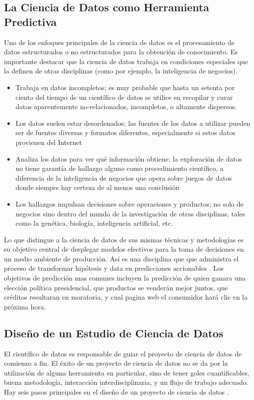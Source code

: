 \begin{spacing}{1.5}
\subsection{La Ciencia de Datos como Herramienta Predictiva}
Uno de los enfoques principales de la ciencia de datos es el procesamiento de datos estructurados o no estructurados para la obtención de conocimiento. Es importante destacar que la ciencia de datos trabaja en condiciones especiales que la definen de otras disciplinas (como por ejemplo, la inteligencia de negocios). 

\begin{itemize}
	\item Trabaja en datos incompletos; es muy probable que hasta un setenta por ciento del tiempo de un científico de datos se utilice en recopilar y curar datos aparentemente no-relacionados, incompletos, o altamente dispersos. 
	\item Los datos suelen estar desordenados; las fuentes de los datos a utilizar pueden ser de fuentes diversas y formatos diferentes, especialmente si estos datos provienen del Internet
	\item Analiza los datos para ver qué información obtiene; la exploración de datos no tiene garantía de hallazgo alguno como procedimiento científico, a diferencia de la inteligencia de negocios que opera sobre juegos de datos donde siempre hay certeza de al menos una conclusión 
	\item Los hallazgos impulsan decisiones sobre operaciones y productos; no solo de negocios sino dentro del mundo de la investigación de otras disciplinas, tales como la genética, biología, inteligencia artificial, etc.
\end{itemize}

Lo que distingue a la ciencia de datos de sus mismas técnicas y metodologías es su objetivo central de desplegar modelos efectivos para la toma de decisiones en un medio ambiente de producción. Así es una disciplina que que administra el proceso de transformar hipótesis y data en predicciones accionables \cite{zumelMount}. Los objetivos de predicción mas comunes incluyen la predicción de quien ganara una elección política presidencial, que productos se venderán mejor juntos, que créditos resultaran en moratoria, y cual pagina web el consumidor hará clic en la próxima hora. 

\subsection{Diseño de un Estudio de Ciencia de Datos}
El científico de datos es responsable de guiar el proyecto de ciencia de datos de comienzo a fin. El éxito de un proyecto de ciencia de datos no se da por la utilización de alguna herramienta en particular, sino de tener goles cuantificables, buena metodología, interacción interdisciplinaria, y un flujo de trabajo adecuado. Hay seis pasos principales en el diseño de un proyecto de ciencia de datos \cite{zumelMount}.


\end{spacing}
